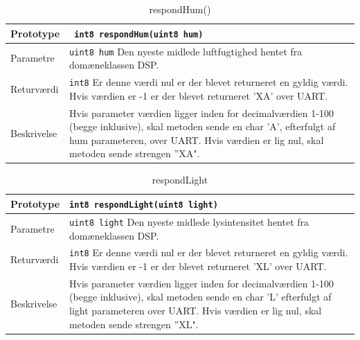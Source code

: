 
\begin{table}[h]
\begin{tabularx}{\textwidth}{| L{2.5 cm} | Z |} \hline
Prototype & \texttt{ int8 respondHum(uint8 hum)} \\\hline
Parametre & \texttt{uint8 hum} \newline
Den nyeste midlede luftfugtighed hentet fra domæneklassen DSP. 
 \\\hline
Returværdi & \texttt{int8} \newline
Er denne værdi nul er der blevet returneret en gyldig værdi. Hvis værdien er -1 er der blevet returneret ’XA’ over UART. \\\hline
Beskrivelse & Hvis parameter værdien ligger inden for decimalværdien 1-100 (begge inklusive), skal metoden sende en char ’A’, efterfulgt af hum parameteren, over UART. Hvis værdien er lig nul, skal metoden sende strengen ”XA".    \\\hline
\end{tabularx}
\caption{respondHum()}
\label{table:respondHum}
\end{table}

\clearpage


\begin{table}[h]
\begin{tabularx}{\textwidth}{| L{2.5 cm} | Z |} \hline
Prototype & \texttt{int8 respondLight(uint8 light)} \\\hline
Parametre & \texttt{uint8 light} \newline
Den nyeste midlede lysintensitet hentet fra domæneklassen DSP. 
 \\\hline
Returværdi & \texttt{int8} \newline
Er denne værdi nul er der blevet returneret en gyldig værdi. Hvis værdien er -1 er der blevet returneret ’XL’ over UART.\\\hline
Beskrivelse & Hvis parameter værdien ligger inden for decimalværdien 1-100 (begge inklusive), skal metoden sende en char ’L’ efterfulgt af light parameteren over UART. Hvis værdien er lig nul, skal metoden sende strengen ”XL".     \\\hline
\end{tabularx}
\caption{respondLight}
\label{table:respondLight}
\end{table}


